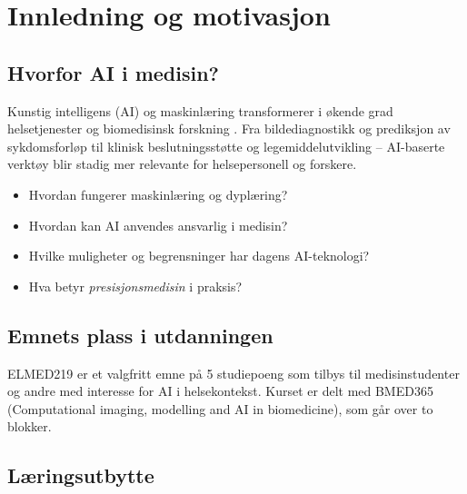 \documentclass[11pt,a4paper]{article}
\begin{document}
\tableofcontents
\newpage

\section{Innledning og motivasjon}

\subsection{Hvorfor AI i medisin?}

Kunstig intelligens (AI) og maskinlæring transformerer i økende grad helsetjenester og biomedisinsk forskning \citep{topol2019high}. Fra bildediagnostikk og prediksjon av sykdomsforløp til klinisk beslutningsstøtte og legemiddelutvikling -- AI-baserte verktøy blir stadig mer relevante for helsepersonell og forskere.

\begin{infobox}
\begin{itemize}[nosep]
    \item Hvordan fungerer maskinlæring og dyplæring?
    \item Hvordan kan AI anvendes ansvarlig i medisin?
    \item Hvilke muligheter og begrensninger har dagens AI-teknologi?
    \item Hva betyr \emph{presisjonsmedisin} i praksis?
\end{itemize}
\end{infobox}

\subsection{Emnets plass i utdanningen}

ELMED219 er et valgfritt emne på 5 studiepoeng som tilbys til medisinstudenter og andre med interesse for AI i helsekontekst. Kurset er delt med BMED365 (Computational imaging, modelling and AI in biomedicine), som går over to blokker.

\subsection{Læringsutbytte}
\end{document}
